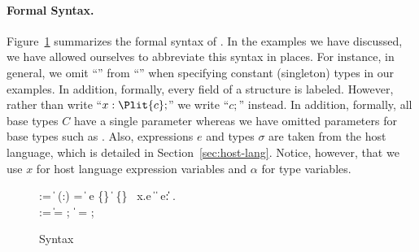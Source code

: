 \paragraph*{Formal Syntax.}
Figure~\ref{fig:ipads-syntax} summarizes the formal syntax of \ipads.
In the examples we have discussed, we have allowed ourselves to
abbreviate this syntax in places.  For instance, in general, we omit
``'' from ``'' when specifying constant
(singleton) types in our examples.  In addition, formally, every field
of a structure is labeled.  However, rather than write ``$x :
\Plit{c};$'' we write ``$c;$'' instead.  In addition, formally, all
base types $C$ have a single parameter whereas we have omitted
parameters for base types such as \Puint.  Also, expressions $e$ and
types $\sigma$ are taken from the host language, which is detailed in
Section~\ref{sec:host-lang}. Notice, however, that we use $x$ for host
language expression variables and $\alpha$ for \ipads{} type
variables. 

\begin{figure}
{\small
\begin{bnf}
   \meta{\itmv} \::= 
     \| \Plit{\const} \nlalt
    \Pfun{} (\var:\ity) = \itmv \| \itmv\; e \nlalt
    \Pstruct{} \{\overrightarrow {\var{:}\itmv}\} \| 
    \Punion{} \{\overrightarrow {\var{:}\itmv}\} \nlalt
    \trversion{\Palt{} \{\overrightarrow {\var{:}\itmv}\}}
    \itmv \; \Pwhere{} \, x.e \| 
    \Popt{}\; \itmv \|
    \iParray{\itmv}{\itmv}{\itmv}{} \nlalt 
    \Pcompute{} \; e{:}\ity \|
     \alpha \| \Prec{} \; \alpha . \itmv
     \\
    \::= \itmv \| \alpha = \itmv;\, \|
  \Prec{} \; \alpha = \itmv;\,
\end{bnf}
\caption{\ipads{} Syntax}
\label{fig:ipads-syntax}
}
\end{figure}



